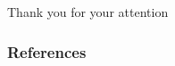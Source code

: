 \documentclass{beamer}
\numberwithin{figure}{section}
\begin{document}
\begin{frame}
	\LARGE\begin{center}
		Thank you for your attention
	\end{center}
\end{frame}




\begin{frame}
	\frametitle{References}
	\raggedright
	\nocite{*}
	
	
\end{frame}
\end{document}
